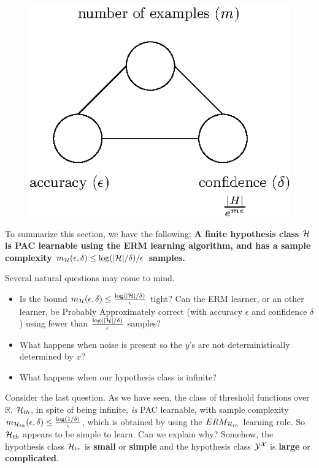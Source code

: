   \begin{figure}[h!]
 \centering\includegraphics[scale=0.8]{connection_m_eps_delta_finite3.eps}
 \end{figure}

To summarize this section, we have  the following:
{\bf A finite hypothesis class $\mathcal{H}$ is PAC learnable using the ERM learning algorithm, and has a sample complexity  $m_{\mathcal{H}}(\epsilon,\delta)\leq \log(|\mathcal{H}|/\delta)/\epsilon$ samples.}

Several natural questions may come to mind.

  \begin{itemize}
\item Is the bound $m_{\mathcal{H}}(\epsilon,\delta) \le \frac{\log(|\mathcal{H}|/\delta)}{\epsilon}$ tight? Can the ERM learner, or an other learner, be Probably Approximately correct (with accuracy $\epsilon$ and confidence $\delta$) using fewer than 
$\frac{\log(|\mathcal{H}|/\delta)}{\epsilon}$ samples?
\item What happens when noise is present so the $y$'s are not deterministically determined by $x$?
\item What happens when our  hypothesis class is infinite?
  \end{itemize}

Consider the last question. As we have seen,  the  class of threshold functions
over $\mathbb{R}$,  $\mathcal{H}_{th}$, in spite of being infinite, \textit{is}  PAC
learnable, with sample complexity $m_{\mathcal{H}_{th}}(\epsilon,\delta)
\le\frac{\log(1/\delta)}{\epsilon}$, which is obtained by using the
$ERM_{\mathcal{H}_{th}}$ learning rule. So  $\mathcal{H}_{th}$ appears to be simple to learn.
Can we explain why? Somehow, the hypothesis class $\mathcal{H}_{tr}$ is {\bf small} or
{\bf simple} and the hypothesis class $\mathcal{Y}^{\mathcal{X}}$ is {\bf large} or {\bf complicated}. 

